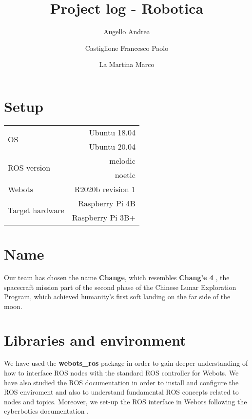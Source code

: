 \documentclass[a4paper]{article}
\begin{document}
	\title{Project log - Robotica}
	\author{Augello Andrea \and Castiglione Francesco Paolo \and La Martina Marco}
	\maketitle
	\tableofcontents

	\section{Setup}\label{sec:Setup}
	\begin{tabular}{|l|r|}
		\hline
		\multirow{2}{4em}{OS} & Ubuntu 18.04 \\
							  & Ubuntu 20.04 \\ \hline
		\multirow{2}{6em}{ROS version} & melodic \\
									   & noetic \\ \hline
		Webots & R2020b revision 1\\ \hline
		\multirow{2}{11em}{Target hardware} & Raspberry Pi 4B \\
											& Raspberry Pi 3B+ \\ \hline
	\end{tabular}

	\section{Name}\label{sec:Name}
	Our team has chosen the name \textbf{Change}, which resembles \textbf{Chang'e 4} \cite{change4}, the spacecraft mission part of the second phase of the Chinese Lunar Exploration Program, which achieved humanity's first soft landing on the far side of the moon.

	\section{Libraries and environment}\label{sec:Libraries}
	We have used the \textbf{webots\_ros} \cite{webotsRos} package in order to gain deeper understanding of how to interface ROS nodes with the standard ROS controller for Webots. We have also studied the ROS documentation \cite{rosTutorial} in order to install and configure the ROS enviroment and also to understand fundamental ROS concepts related to nodes and topics.
	Moreover, we set-up the ROS interface in Webots following the cyberbotics documentation \cite{rosTutorial}.
	
	
	
\end{document}
